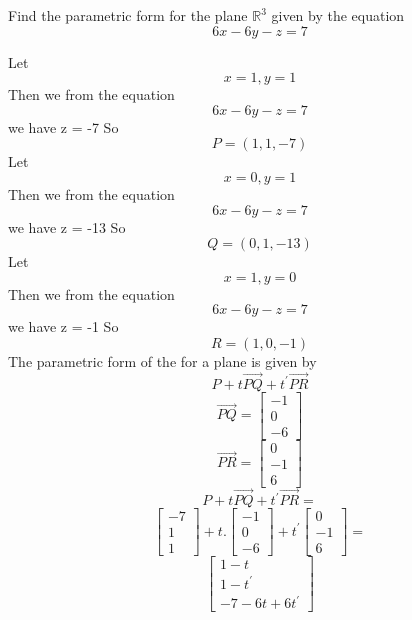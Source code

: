 Find the parametric form for the plane $\mathbb{R}^3$ given by the equation 
\[
6x-6y-z=7
\]

Let 
\[
x=1, y=1
\]
Then we from the equation 
\[
6x-6y-z=7
\]
we have z = -7
So \[
P = (1,1,-7)
\]
Let
\[
x=0, y=1
\]
Then we from the equation 
\[
6x-6y-z=7
\]
we have z = -13
So
\[
Q = (0,1,-13)
\]
Let
\[
x=1, y=0
\]
Then we from the equation 
\[
6x-6y-z=7
\]
we have z = -1
So
\[
R = (1,0,-1)
\]
The parametric form of the for a plane is given by
\[
P + t \overrightarrow{PQ} + t^\prime \overrightarrow{PR}
\]
\[
\overrightarrow{PQ}= \begin{bmatrix}
    -1 \\ 0 \\ -6
\end{bmatrix}
\]
\[
\overrightarrow{PR}= \begin{bmatrix}
    0 \\ -1 \\ 6
\end{bmatrix}
\]
\[
P + t \overrightarrow{PQ} + t^\prime \overrightarrow{PR} =
\]
\[
\begin{bmatrix}
    -7 \\ 1 \\ 1
\end{bmatrix} + t . \begin{bmatrix}
    -1 \\ 0 \\ -6
\end{bmatrix} + t^\prime  \begin{bmatrix}
    0 \\ -1 \\ 6
\end{bmatrix} = 
\]
\[
\begin{bmatrix}
    1-t \\ 1-t^\prime \\ -7-6t+6t^\prime
\end{bmatrix}
\]